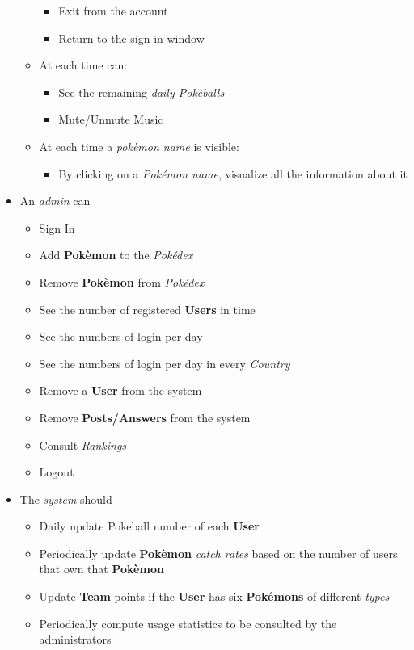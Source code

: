 \begin{itemize}
\begin{itemize}
		\begin{itemize}
			\item Exit from the account
			\item Return to the sign in window
		\end{itemize}
		\item At each time can:
		\begin{itemize}
			\item See the remaining \textit{daily Pokèballs}
			\item Mute/Unmute Music
		\end{itemize}
		\item At each time a \textit{pokèmon name} is visible:
		\begin{itemize}
			\item By clicking on a \textit{Pokémon name}, visualize all the information about it
		\end{itemize}
	\end{itemize}
	\item An \textit{admin} can
	\begin{itemize}
		\item Sign In
		\item Add \textbf{Pokèmon} to the \textit{Pokédex}
		\item Remove \textbf{Pokèmon} from \textit{Pokédex}
		\item See the number of registered \textbf{Users} in time
		\item See the numbers of login per day
		\item See the numbers of login per day in every \textit{Country}
		\item Remove a \textbf{User} from the system
		\item Remove \textbf{Posts/Answers} from the system
		\item Consult \textit{Rankings}
		\item Logout
\end{itemize}
	\item The \textit{system} should
	\begin{itemize}
		\item Daily update Pokeball number of each \textbf{User}
		\item Periodically update \textbf{Pokèmon} \textit{catch rates} based on the number of users that own that \textbf{Pokèmon}
		\item Update \textbf{Team} points if the \textbf{User} has six \textbf{Pokémons} of different \textit{types}
		\item Periodically compute usage statistics to be consulted by the administrators
	\end{itemize}
\end{itemize}

